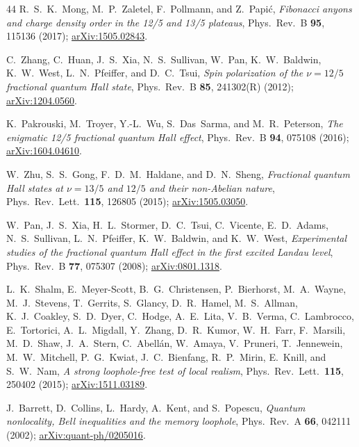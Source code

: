 \documentclass[aps,pra,twocolumn,superscriptaddress,longbibliography,floatfix,nofootinbib]{revtex4-2}
\begin{document}
\begin{thebibliography}{44}
R.~S.~K.~Mong, M.~P.~Zaletel, F.~Pollmann, and Z.~Papi\'{c},
\emph{Fibonacci anyons and charge density order in the 12/5 and 13/5 plateaus},
Phys.\ Rev.\ B \textbf{95}, 115136 (2017);
\href{https://arxiv.org/abs/1505.02843}{arXiv:1505.02843}.

C.~Zhang, C.~Huan, J.~S.~Xia, N.~S.~Sullivan, W.~Pan, K.~W.~Baldwin, K.~W.~West, L.~N.~Pfeiffer, and D.~C.~Tsui,
\emph{Spin polarization of the $\nu=12/5$ fractional quantum Hall state},
Phys.\ Rev.\ B \textbf{85}, 241302(R) (2012);
\href{https://arxiv.org/abs/1204.0560}{arXiv:1204.0560}.

K.~Pakrouski, M.~Troyer, Y.-L.~Wu, S.~Das~Sarma, and M.~R.~Peterson,
\emph{The enigmatic 12/5 fractional quantum Hall effect},
Phys.\ Rev.\ B \textbf{94}, 075108 (2016);
\href{https://arxiv.org/abs/1604.04610}{arXiv:1604.04610}.

W.~Zhu, S.~S.~Gong, F.~D.~M.~Haldane, and D.~N.~Sheng,
\emph{Fractional quantum Hall states at $\nu=13/5$ and $12/5$ and their
non-Abelian nature}, Phys.\ Rev.\ Lett.\ \textbf{115}, 126805 (2015);
\href{https://arxiv.org/abs/1505.03050}{arXiv:1505.03050}.

W.~Pan, J.~S.~Xia, H.~L.~Stormer, D.~C.~Tsui, C.~Vicente, E.~D.~Adams, N.~S.~Sullivan, L.~N.~Pfeiffer, K.~W.~Baldwin, and K.~W.~West,
\emph{Experimental studies of the fractional quantum Hall effect in the first excited Landau level},
Phys.\ Rev.\ B \textbf{77}, 075307 (2008);
\href{https://arxiv.org/abs/0801.1318}{arXiv:0801.1318}.


L.~K.~Shalm, E.~Meyer-Scott, B.~G.~Christensen, P.~Bierhorst,
M.~A.~Wayne, M.~J.~Stevens, T.~Gerrits, S.~Glancy, D.~R.~Hamel,
M.~S.~Allman, K.~J.~Coakley, S.~D.~Dyer, C.~Hodge, A.~E.~Lita,
V.~B.~Verma, C.~Lambrocco, E.~Tortorici, A.~L.~Migdall, Y.~Zhang,
D.~R.~Kumor, W.~H.~Farr, F.~Marsili, M.~D.~Shaw, J.~A.~Stern,
C.~Abell\'an, W.~Amaya, V.~Pruneri, T.~Jennewein, M.~W.~Mitchell,
P.~G.~Kwiat, J.~C.~Bienfang, R.~P.~Mirin, E.~Knill, and S.~W.~Nam,
\emph{A strong loophole-free test of local realism},
Phys.\ Rev.\ Lett.\ \textbf{115}, 250402 (2015);
\href{https://arxiv.org/abs/1511.03189}{arXiv:1511.03189}.

J.~Barrett, D.~Collins, L.~Hardy, A.~Kent, and S.~Popescu,
\emph{Quantum nonlocality, Bell inequalities and the memory loophole},
Phys.\ Rev.\ A \textbf{66}, 042111 (2002);
\href{https://arxiv.org/abs/quant-ph/0205016}{arXiv:quant-ph/0205016}.


\end{thebibliography}
\end{document}
